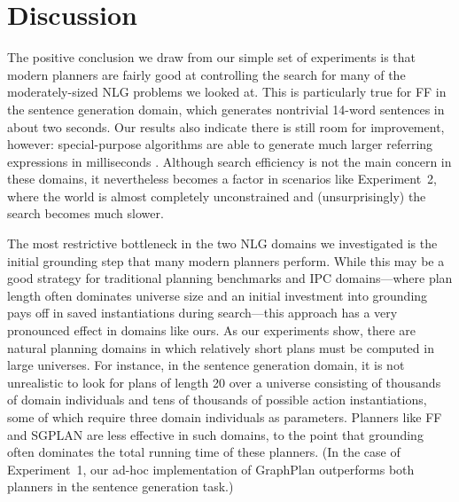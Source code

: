 
\section{Discussion}
\label{sec:discussion}

The positive conclusion we draw from our simple set of experiments is that
modern planners are fairly good at controlling the search for many of the
moderately-sized NLG problems we looked at. This is particularly true for
FF in the sentence generation domain, which generates nontrivial 14-word
sentences in about two seconds. Our results also indicate there is still
room for improvement, however: special-purpose algorithms are able to
generate much larger referring expressions in milliseconds
\citep{AreKolStr08}. Although search efficiency is not the main concern in
these domains, it nevertheless becomes a factor in scenarios like
Experiment~2, where the world is almost completely unconstrained and
(unsurprisingly) the search becomes much slower.

The most restrictive bottleneck in the two NLG domains we investigated is
the initial grounding step that many modern planners perform. While this
may be a good strategy for traditional planning benchmarks and IPC
domains---where plan length often dominates universe size and an initial
investment into grounding pays off in saved instantiations during
search---this approach has a very pronounced effect in domains like ours.
As our experiments show, there are natural planning domains in which
relatively short plans must be computed in large universes. For instance,
in the sentence generation domain, it is not unrealistic to look for plans
of length 20 over a universe consisting of thousands of domain individuals
and tens of thousands of possible action instantiations, some of which
require three domain individuals as parameters. Planners like FF and SGPLAN
are less effective in such domains, to the point that grounding
often dominates the total running time of these planners. (In the case of
Experiment~1, our ad-hoc implementation of GraphPlan outperforms both
planners in the sentence generation task.)

